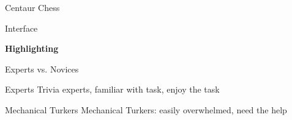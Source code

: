 \documentclass[compress]{beamer}
\newcommand{\fsi}[2]{
\begin{frame}[plain]
\vspace*{-1pt}
\makebox[\linewidth]{\texttt{[image: \#1]}}
\begin{center}
#2
\end{center}
\end{frame}
}
\begin{document}







\fsi{simtrans/centaur-chess}{Centaur Chess}


\fsi{qb/augment/screenshot_all}{Interface}

\fsi{qb/augment/screenshot_guesses}{}

\fsi{qb/augment/screenshot_highlight}{{\bf Highlighting}}

\fsi{qb/augment/screenshot_evidence}{}

\begin{frame}{Experts vs. Novices}

 \begin{block}{Experts}
   Trivia experts, familiar with task, enjoy the task
 \end{block}

 \begin{block}{Mechanical Turkers}
   Mechanical Turkers: easily overwhelmed, need the help
 \end{block}

\end{frame}
\end{document}
